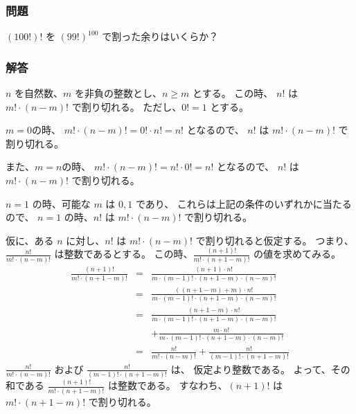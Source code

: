 \subsubsection{問題}
\label{sssec:階乗:階乗の階乗を割った余り:問題}

$(100 !)!$ を $(99!)^{100}$ で割った余りはいくらか？


\clearpage
\subsubsection{解答}
\label{sssec:階乗:階乗の階乗を割った余り:解答}

\begin{Lemma} \label{lemma:PascalTriangle}
  $n$ を自然数、$m$ を非負の整数とし、$n \ge m$ とする。
  この時、
  $n!$ は $m! \cdot (n-m)!$ で割り切れる。
  ただし、$0! = 1$ とする。
\end{Lemma}
\begin{Proof}
    $m=0$の時、
    $m! \cdot (n-m)! = 0! \cdot n! = n!$ となるので、
    $n!$ は $m! \cdot (n-m)!$ で割り切れる。

    また、$m=n$の時、
    $m! \cdot (n-m)! = n! \cdot 0! = n!$ となるので、
    $n!$ は $m! \cdot (n-m)!$ で割り切れる。

    $n=1$ の時、可能な $m$ は $0,1$ であり、
    これらは上記の条件のいずれかに当たるので、
    $n=1$ の時、$n!$ は $m! \cdot (n-m)!$ で割り切れる。

    仮に、ある $n$ に対し、$n!$ は $m! \cdot (n-m)!$ で割り切れると仮定する。
    つまり、$\frac{n!}{m! \cdot (n-m)!}$ は整数であるとする。
    この時、$\frac{(n+1)!}{m! \cdot (n+1-m)!}$ の値を求めてみる。
      \begin{eqnarray}
          \frac{(n+1)!}{m! \cdot (n+1-m)!}
            & = &
              \frac{(n+1) \cdot n!}{m \cdot (m-1)! \cdot (n+1-m) \cdot (n-m)!}
          \\
            & = &
              \frac{((n+1-m)+m) \cdot n!}{m \cdot (m-1)! \cdot (n+1-m) \cdot (n-m)!}
          \\
            & = &
              \frac{(n+1-m) \cdot n!}{m \cdot (m-1)! \cdot (n+1-m) \cdot (n-m)!}
          \nonumber \\ & &
            + \frac{m \cdot n!}{m \cdot (m-1)! \cdot (n+1-m) \cdot (n-m)!}
          \\
            & = &
              \frac{n!}{m! \cdot (n-m)!}
            + \frac{n!}{(m-1)! \cdot (n+1-m)!}
      \end{eqnarray}
    $\frac{n!}{m! \cdot (n-m)!}$ および $\frac{n!}{(m-1)! \cdot (n+1-m)!}$ は、
    仮定より整数である。
    よって、その和である $\frac{(n+1)!}{m! \cdot (n+1-m)!}$ は整数である。
    すなわち、$(n+1)!$ は $m! \cdot (n+1-m)!$ で割り切れる。
\end{Proof}

